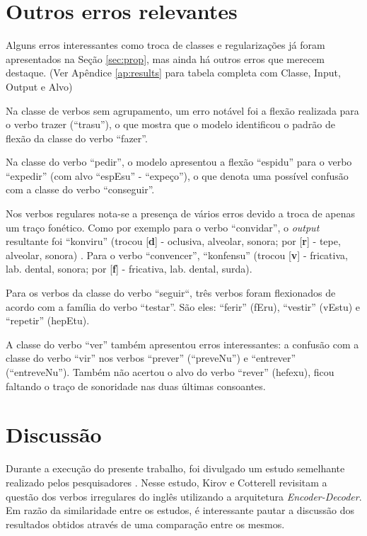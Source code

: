 \section{Outros erros relevantes}
\label{sec:interesting}

Alguns erros interessantes como troca de classes e regularizações já foram apresentados na Seção \ref{sec:prop}, mas ainda há outros erros que merecem destaque. (Ver Apêndice \ref{ap:results} para tabela completa com Classe, Input, Output e Alvo)

Na classe de verbos sem agrupamento, um erro notável foi a flexão realizada para o verbo trazer (“trasu”), o que mostra que o modelo identificou o padrão de flexão da classe do verbo “fazer”. 

Na classe do verbo “pedir”, o modelo apresentou a flexão “espidu” para o verbo “expedir” (com alvo “espEsu” - “expeço”), o que denota uma possível confusão com a classe do verbo “conseguir”.

Nos verbos regulares nota-se a presença de vários erros devido a troca de apenas um traço fonético. Como por exemplo para o verbo “convidar”, o \textit{output} resultante foi “konviru” (trocou [\textbf{d}] - oclusiva, alveolar, sonora; por [\textbf{r}] - tepe, alveolar, sonora) . Para o verbo “convencer”, “konfensu” (trocou [\textbf{v}] - fricativa, lab. dental, sonora; por [\textbf{f}] - fricativa, lab. dental, surda).

Para os verbos da classe do verbo “seguir“, três verbos foram flexionados de acordo com a família do verbo “testar”. São eles: “ferir” (fEru), “vestir” (vEstu) e “repetir” (hepEtu).

A classe do verbo “ver” também apresentou erros interessantes: a confusão com a classe do verbo “vir” nos verbos “prever” (“preveNu”) e “entrever” (“entreveNu”). Também não acertou o alvo do verbo “rever” (hefexu), ficou faltando o traço de sonoridade nas duas últimas consoantes.

\section{Discussão}
\label{sec:discuss}

Durante a execução do presente trabalho, foi divulgado um estudo semelhante realizado pelos pesquisadores \cite{kirov:2018}. Nesse estudo, Kirov e Cotterell revisitam a questão dos verbos irregulares do inglês utilizando a arquitetura \textit{Encoder-Decoder}. Em razão da similaridade entre os estudos, é interessante pautar a discussão dos resultados obtidos através de uma comparação entre os mesmos. 

